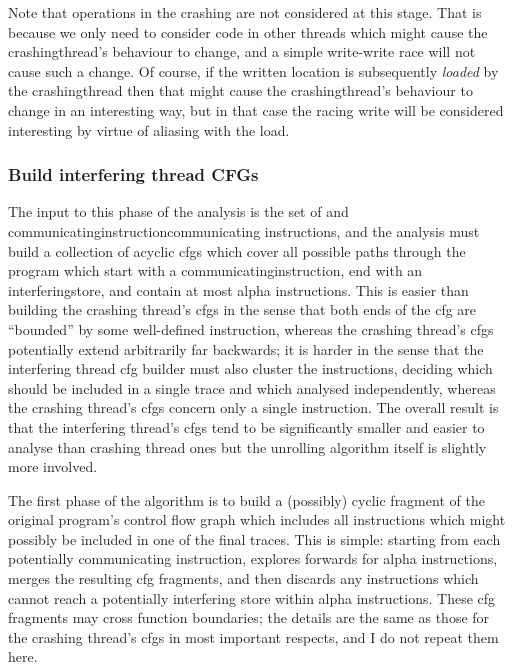 Note that  operations in the crashing {\StateMachine} are
not considered at this stage.  That is because we only need to
consider code in other threads which might cause the
\gls{crashingthread}'s behaviour to change, and a simple write-write
race will not cause such a change.  Of course, if the written location
is subsequently \emph{loaded} by the \gls{crashingthread} then that
might cause the \gls{crashingthread}'s behaviour to change in an
interesting way, but in that case the racing write will be considered
interesting by virtue of aliasing with the load.

\subsubsection{Build interfering thread CFGs}

The input to this phase of the analysis is the set of
 and
\gls{communicatinginstruction}{communicating} instructions, and the
analysis must build a collection of acyclic \glspl{cfg} which cover
all possible paths through the program which start with a
\gls{communicatinginstruction}, end with an \gls{interferingstore},
and contain at most \gls{alpha} instructions.  This is easier than
building the crashing thread's \glspl{cfg} in the sense that both ends
of the \gls{cfg} are ``bounded'' by some well-defined instruction,
whereas the crashing thread's \glspl{cfg} potentially extend
arbitrarily far backwards; it is harder in the sense that the
interfering thread \gls{cfg} builder must also cluster the
instructions, deciding which should be included in a single trace and
which analysed independently, whereas the crashing thread's
\glspl{cfg} concern only a single instruction.  The overall result is
that the interfering thread's \glspl{cfg} tend to be significantly
smaller and easier to analyse than crashing thread ones but the
unrolling algorithm itself is slightly more involved.

The first phase of the algorithm is to build a (possibly) cyclic
fragment of the original program's control flow graph which includes
all instructions which might possibly be included in one of the final
traces.  This is simple: starting from each potentially communicating
instruction, {\technique} explores forwards for \gls{alpha}
instructions, merges the resulting \gls{cfg} fragments, and then discards
any instructions which cannot reach a potentially interfering store
within \gls{alpha} instructions.  These \gls{cfg} fragments may cross
function boundaries; the details are the same as those for the
crashing thread's \glspl{cfg} in most important respects, and I do not repeat
them here.

